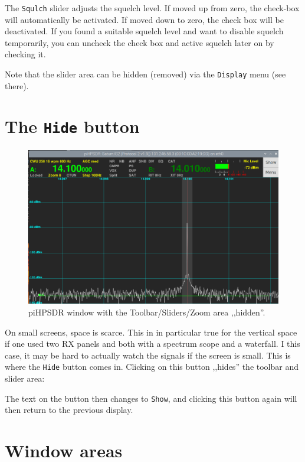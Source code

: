 \documentclass[12pt]{book}
\def\rett#1{\texttt{\color{red}#1}}
\def\bltt#1{\texttt{\color{blue}#1}}
\def\pH{pi\-HPSDR\xspace}
\begin{document}
The \rett{Squlch} slider adjusts the squelch level. If moved up from zero, the check-box will automatically
be activated. If moved down to zero, the check box will be deactivated. If you found a suitable squelch
level and want to disable squelch temporarily, you can uncheck the check box and active squelch later
on by checking it.

Note that the slider area can be hidden (removed) via the \bltt{Display} menu (see there).
\section{The \texttt{Hide} button}
\begin{figure}[ht]
\center
\includegraphics[width=12cm]{Hidden.png}
\caption{\pH window with the Toolbar/Sliders/Zoom
area ,,hidden''.}
\end{figure}

On small screens, space is scarce. This in in particular true
for the vertical space if one used two RX panels and both
with a spectrum scope and a waterfall. I this case, it may be
hard to actually watch the signals if the screen is small.
This is where the \rett{Hide} button comes in. Clicking on
this button ,,hides'' the toolbar and slider area:


The text on the button then changes to \rett{Show}, and
clicking this button again will then return to the
previous display.

\section{Window areas}
\end{document}
